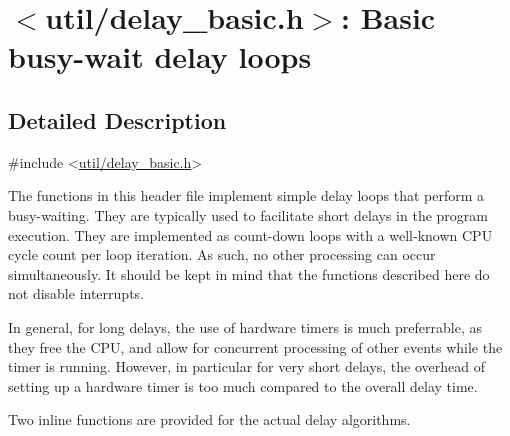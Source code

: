 \hypertarget{group__util__delay__basic}{}\section{$<$util/delay\+\_\+basic.h$>$\+: Basic busy-\/wait delay loops}
\label{group__util__delay__basic}


\subsection{Detailed Description}

\begin{DoxyCode}
\textcolor{preprocessor}{#include <\hyperlink{delay__basic_8h}{util/delay\_basic.h}>}
\end{DoxyCode}


The functions in this header file implement simple delay loops that perform a busy-\/waiting. They are typically used to facilitate short delays in the program execution. They are implemented as count-\/down loops with a well-\/known C\+PU cycle count per loop iteration. As such, no other processing can occur simultaneously. It should be kept in mind that the functions described here do not disable interrupts.

In general, for long delays, the use of hardware timers is much preferrable, as they free the C\+PU, and allow for concurrent processing of other events while the timer is running. However, in particular for very short delays, the overhead of setting up a hardware timer is too much compared to the overall delay time.

Two inline functions are provided for the actual delay algorithms. 